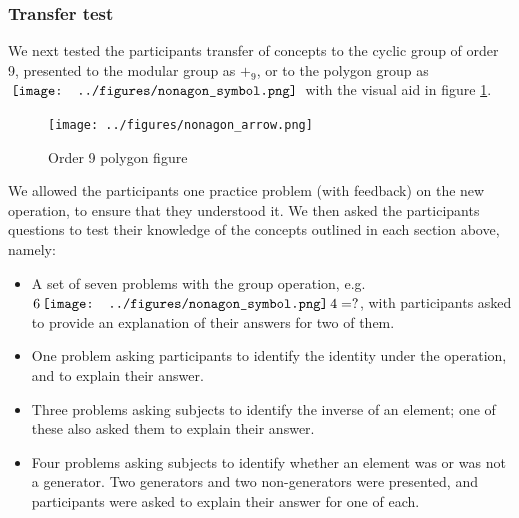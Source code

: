 \documentclass[man,mask,10pt]{apa6}
\newcommand{\nonagon}{\,\vcenter{\hbox{\texttt{[image: ../figures/nonagon\_symbol.png]}}}\,}
\begin{document}
\subsubsection{Transfer test}
We next tested the participants transfer of concepts to the cyclic group of order 9, presented to the modular group as $+_9$, or to the polygon group as $\nonagon$ with the visual aid in figure \ref{nonagonex}. 
\begin{figure} \centering \texttt{[image: ../figures/nonagon\_arrow.png]} \caption{Order 9 polygon figure} \label{nonagonex} \end{figure} \noindent
We allowed the participants one practice problem (with feedback) on the new operation, to ensure that they understood it. We then asked the participants questions to test their knowledge of the concepts outlined in each section above, namely:
\begin{itemize} 
\item A set of seven problems with the group operation, e.g. $6 \nonagon 4 = ?$, with participants asked to provide an explanation of their answers for two of them. 
\item One problem asking participants to identify the identity under the operation, and to explain their answer.
\item Three problems asking subjects to identify the inverse of an element; one of these also asked them to explain their answer.
\item Four problems asking subjects to identify whether an element was or was not a generator. Two generators and two non-generators were presented, and participants were asked to explain their answer for one of each.
\end{itemize}
\end{document}
